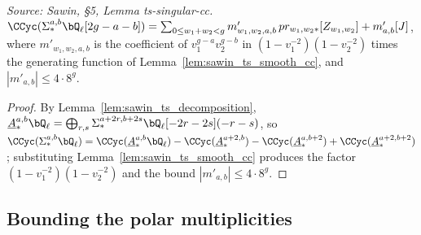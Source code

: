 \begin{lemma}
  \label{lem:sawin_ts_singular_cc}
  \textit{Source: Sawin, §5, Lemma ts-singular-cc.}
  $\CCyc(\Sigma^{a,b}_*\bQ_\ell[2g-a-b]) = \sum_{0\le w_1+w_2<g}
  m'_{w_1,w_2,a,b}\,pr_{w_1,w_2*}[Z_{w_1,w_2}] + m'_{a,b}[J]$, where
  $m'_{w_1,w_2,a,b}$ is the coefficient of $v_1^{g-a}v_2^{g-b}$ in
  $(1-v_1^{-2})(1-v_2^{-2})$ times the generating function of
  Lemma~\ref{lem:sawin_ts_smooth_cc}, and $|m'_{a,b}|\le 4\cdot 8^g$.
\end{lemma}
\begin{proof}
  By Lemma~\ref{lem:sawin_ts_decomposition},
  $\underline A^{a,b}_*\bQ_\ell = \bigoplus_{r,s}\Sigma^{a+2r,b+2s}_*\bQ_\ell[-2r-2s](-r-s)$,
  so $\CCyc(\Sigma^{a,b}_*\bQ_\ell) = \CCyc(\underline A^{a,b}_*\bQ_\ell) -
  \CCyc(\underline A^{a+2,b}_*) - \CCyc(\underline A^{a,b+2}_*) +
  \CCyc(\underline A^{a+2,b+2}_*)$; substituting
  Lemma~\ref{lem:sawin_ts_smooth_cc} produces the factor $(1-v_1^{-2})(1-v_2^{-2})$
  and the bound $|m'_{a,b}|\le 4\cdot 8^g$.
\end{proof}

\subsection{Bounding the polar multiplicities}

